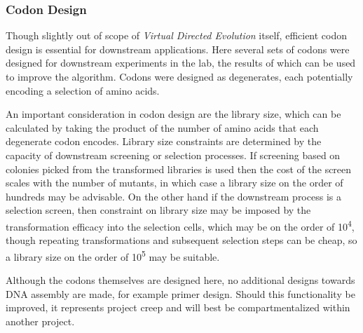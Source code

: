 \documentclass[16pt]{article}
\begin{document}
\subsubsection{Codon Design}

Though slightly out of scope of \textit{Virtual Directed Evolution} itself, efficient codon design is essential for downstream applications.
Here several sets of codons were designed for downstream experiments in the lab, the results of which can be used to improve the algorithm.
Codons were designed as degenerates, each potentially encoding a selection of amino acids.

An important consideration in codon design are the library size, which can be calculated by taking the product of the number of amino acids that each degenerate codon  encodes.
Library size constraints are determined by the capacity of downstream screening or selection processes.
If screening based on colonies picked from the transformed libraries is used then the cost of the screen scales with the number of mutants, in which case a library size on the order of hundreds may be advisable.
On the other hand if the downstream process is a selection screen, then constraint on library size may be imposed by the transformation efficacy into the selection cells, which may be on the order of 10\textsuperscript{4}, though repeating transformations and subsequent selection steps can be cheap, so a library size on the order of 10\textsuperscript{5} may be suitable.

Although the codons themselves are designed here, no additional designs towards DNA assembly are made, for example primer design.
Should this functionality be improved, it represents project creep and will best be compartmentalized within another project.

\printbibliography
\end{document}

